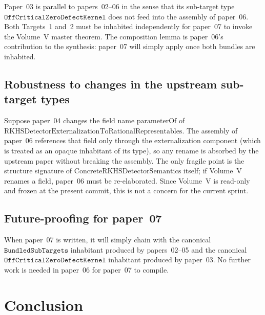 \documentclass[12pt]{article}
\theoremstyle{plain}
\theoremstyle{definition}
\theoremstyle{remark}
\begin{document}
Paper~03 is parallel to papers~02--06 in the sense that its sub-target
type \(\mathtt{OffCriticalZeroDefectKernel}\) does not feed into the
assembly of paper~06. Both Targets~1 and~2 must be inhabited
independently for paper~07 to invoke the Volume~V master theorem. The
composition lemma  is paper~06's
contribution to the synthesis: paper~07 will simply apply
 once both bundles are inhabited.

\subsection{Robustness to changes in the upstream sub-target types}

Suppose paper~04 changes the field name
\(\mathrm{parameterOf}\) of
\(\mathrm{RKHSDetectorExternalizationToRationalRepresentables}\). The
assembly of paper~06 references that field only through the
externalization component (which is treated as an opaque inhabitant of
its type), so any rename is absorbed by the upstream paper without
breaking the assembly. The only fragile point is the structure
signature of \(\mathrm{ConcreteRKHSDetectorSemantics}\) itself; if
Volume~V renames a field, paper~06 must be re-elaborated. Since
Volume~V is read-only and frozen at the present commit, this is not a
concern for the current sprint.

\subsection{Future-proofing for paper~07}

When paper~07 is written, it will simply chain
 with the canonical
\(\mathtt{BundledSubTargets}\) inhabitant produced by papers~02--05
and the canonical \(\mathtt{OffCriticalZeroDefectKernel}\) inhabitant
produced by paper~03. No further work is needed in paper~06 for
paper~07 to compile.

\section{Conclusion}
\label{sec:conclusion}
\end{document}
